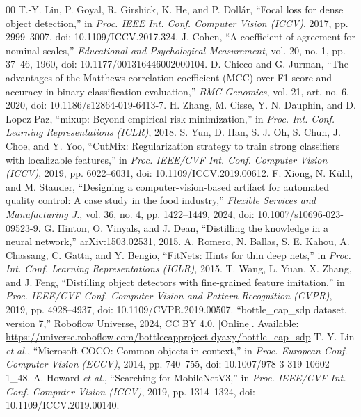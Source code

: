 \documentclass[conference]{IEEEtran}
\begin{document}
\begin{thebibliography}{00}
 T.-Y. Lin, P. Goyal, R. Girshick, K. He, and P. Dollár, ``Focal loss for dense object detection,'' in \textit{Proc. IEEE Int. Conf. Computer Vision (ICCV)}, 2017, pp. 2999--3007, doi: 10.1109/ICCV.2017.324.
 J. Cohen, ``A coefficient of agreement for nominal scales,'' \textit{Educational and Psychological Measurement}, vol. 20, no. 1, pp. 37--46, 1960, doi: 10.1177/001316446002000104.
 D. Chicco and G. Jurman, ``The advantages of the Matthews correlation coefficient (MCC) over F1 score and accuracy in binary classification evaluation,'' \textit{BMC Genomics}, vol. 21, art. no. 6, 2020, doi: 10.1186/s12864-019-6413-7.
 H. Zhang, M. Cisse, Y. N. Dauphin, and D. Lopez-Paz, ``mixup: Beyond empirical risk minimization,'' in \textit{Proc. Int. Conf. Learning Representations (ICLR)}, 2018.
 S. Yun, D. Han, S. J. Oh, S. Chun, J. Choe, and Y. Yoo, ``CutMix: Regularization strategy to train strong classifiers with localizable features,'' in \textit{Proc. IEEE/CVF Int. Conf. Computer Vision (ICCV)}, 2019, pp. 6022--6031, doi: 10.1109/ICCV.2019.00612.
 F. Xiong, N. Kühl, and M. Stauder, ``Designing a computer-vision-based artifact for automated quality control: A case study in the food industry,'' \textit{Flexible Services and Manufacturing J.}, vol. 36, no. 4, pp. 1422--1449, 2024, doi: 10.1007/s10696-023-09523-9.
 G. Hinton, O. Vinyals, and J. Dean, ``Distilling the knowledge in a neural network,'' arXiv:1503.02531, 2015.
 A. Romero, N. Ballas, S. E. Kahou, A. Chassang, C. Gatta, and Y. Bengio, ``FitNets: Hints for thin deep nets,'' in \textit{Proc. Int. Conf. Learning Representations (ICLR)}, 2015.
 T. Wang, L. Yuan, X. Zhang, and J. Feng, ``Distilling object detectors with fine-grained feature imitation,'' in \textit{Proc. IEEE/CVF Conf. Computer Vision and Pattern Recognition (CVPR)}, 2019, pp. 4928--4937, doi: 10.1109/CVPR.2019.00507.
 ``bottle\_cap\_sdp dataset, version 7,'' Roboflow Universe, 2024, CC BY 4.0. [Online]. Available: \url{https://universe.roboflow.com/bottlecapproject-dyaxy/bottle_cap_sdp}
 T.-Y. Lin \textit{et al.}, ``Microsoft COCO: Common objects in context,'' in \textit{Proc. European Conf. Computer Vision (ECCV)}, 2014, pp. 740--755, doi: 10.1007/978-3-319-10602-1\_48.
 A. Howard \textit{et al.}, ``Searching for MobileNetV3,'' in \textit{Proc. IEEE/CVF Int. Conf. Computer Vision (ICCV)}, 2019, pp. 1314--1324, doi: 10.1109/ICCV.2019.00140.

\end{thebibliography}
\end{document}
